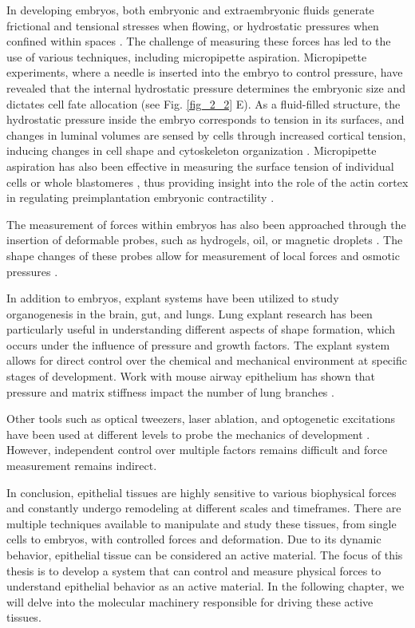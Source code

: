 In developing embryos, both embryonic and extraembryonic fluids generate frictional and tensional stresses when flowing, or hydrostatic pressures when confined within spaces \cite{vianello2019, chan2020}. The challenge of measuring these forces has led to the use of various techniques, including micropipette aspiration. Micropipette experiments, where a needle is inserted into the embryo to control pressure, have revealed that the internal hydrostatic pressure determines the embryonic size and dictates cell fate allocation \cite{chan2019} (see Fig. \ref{fig_2_2} E). As a fluid-filled structure, the hydrostatic pressure inside the embryo corresponds to tension in its surfaces, and changes in luminal volumes are sensed by cells through increased cortical tension, inducing changes in cell shape and cytoskeleton organization \cite{chan2019, choudhury2022}. Micropipette aspiration has also been effective in measuring the surface tension of individual cells or whole blastomeres \cite{dumortier2019}, thus providing insight into the role of the actin cortex in regulating preimplantation embryonic contractility \cite{ozguc2022, firmin2022}.

The measurement of forces within embryos has also been approached through the insertion of deformable probes, such as hydrogels, oil, or magnetic droplets \cite{dolega2017, campas2014, serwane2017}. The shape changes of these probes allow for measurement of local forces and osmotic pressures \cite{mongera2023}.

In addition to embryos, explant systems have been utilized to study organogenesis in the brain, gut, and lungs. Lung explant research has been particularly useful in understanding different aspects of shape formation, which occurs under the influence of pressure and growth factors. The explant system allows for direct control over the chemical and mechanical environment at specific stages of development. Work with mouse airway epithelium has shown that pressure and matrix stiffness impact the number of lung branches \cite{palmer2021, varner2015, nelson2017}.

Other tools such as optical tweezers, laser ablation, and optogenetic excitations have been used at different levels to probe the mechanics of development \cite{lecuit2011, gomez-gonzalez2020}. However, independent control over multiple factors remains difficult and force measurement remains indirect.

In conclusion, epithelial tissues are highly sensitive to various biophysical forces and constantly undergo remodeling at different scales and timeframes. There are multiple techniques available to manipulate and study these tissues, from single cells to embryos, with controlled forces and deformation. Due to its dynamic behavior, epithelial tissue can be considered an active material. The focus of this thesis is to develop a system that can control and measure physical forces to understand epithelial behavior as an active material. In the following chapter, we will delve into the molecular machinery responsible for driving these active tissues.